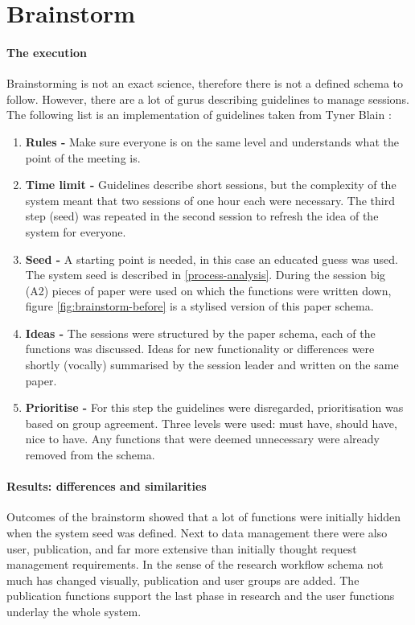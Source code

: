 \section{Brainstorm}
\label{brainstorm}

\paragraph{The execution}
Brainstorming is not an exact science, therefore there is not a defined schema to follow.
However, there are a lot of gurus describing guidelines to manage sessions.
The following list is an implementation of guidelines taken from Tyner Blain \cite{brainstormWebsite}:

\begin{enumerate}
	\item \textbf{Rules -} Make sure everyone is on the same level and understands what the point of the meeting is.
	\item \textbf{Time limit -} Guidelines describe short sessions, but the complexity of the system meant that two sessions of one hour each were necessary.
		The third step (seed) was repeated in the second session to refresh the idea of the system for everyone.
	\item \textbf{Seed -} A starting point is needed, in this case an educated guess was used.
		The system seed is described in \ref{process-analysis}.
		During the session big (A2) pieces of paper were used on which the functions were written down, figure \ref{fig:brainstorm-before} is a stylised version of this paper schema.
	\item \textbf{Ideas -} The sessions were structured by the paper schema, each of the functions was discussed.
		Ideas for new functionality or differences were shortly (vocally) summarised by the session leader and written on the same paper.
	\item \textbf{Prioritise -} For this step the guidelines were disregarded, prioritisation was based on group agreement.
		Three levels were used: must have, should have, nice to have.
		Any functions that were deemed unnecessary were already removed from the schema.
\end{enumerate}

\paragraph{Results: differences and similarities}
Outcomes of the brainstorm showed that a lot of functions were initially hidden when the system seed was defined.
Next to data management there were also user, publication, and far more extensive than initially thought request management requirements.
In the sense of the research workflow schema not much has changed visually, publication and user groups are added.
The publication functions support the last phase in research and the user functions underlay the whole system.

